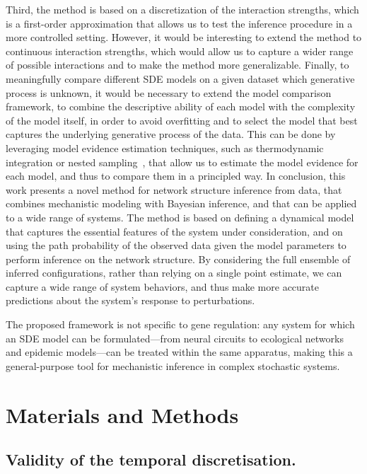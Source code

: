 \documentclass[10pt, aps, rmp,  twocolumn, superscriptaddress, floatfix, showkeys]{revtex4-2}
\begin{document}
Third, the method is based on a discretization of the interaction strengths, which is a first-order approximation that allows us to test the inference procedure in a more controlled setting. However, it would be interesting to extend the method to continuous interaction strengths, which would allow us to capture a wider range of possible interactions and to make the method more generalizable. 
Finally, to meaningfully compare different SDE models on a given dataset which generative process is unknown, it would be necessary to extend the model comparison framework, to combine the descriptive ability of each model with the complexity of the model itself, in order to avoid overfitting and to select the model that best captures the underlying generative process of the data. This can be done by leveraging model evidence estimation techniques, such as thermodynamic integration or nested sampling~\cite{skilling2006nested, buchner2023nested}, that allow us to estimate the model evidence for each model, and thus to compare them in a principled way.
In conclusion, this work presents a novel method for network structure inference from data, that combines mechanistic modeling with Bayesian inference, and that can be applied to a wide range of systems. The method is based on defining a dynamical model that captures the essential features of the system under consideration, and on using the path probability of the observed data given the model parameters to perform inference on the network structure. By considering the full ensemble of inferred configurations, rather than relying on a single point estimate, we can capture a wide range of system behaviors, and thus make more accurate predictions about the system's response to perturbations.

The proposed framework is not specific to gene regulation: any system for which an SDE model can be formulated—from neural circuits to ecological networks and epidemic models—can be treated within the same apparatus, making this a general-purpose tool for mechanistic inference in complex stochastic systems.



\section{Materials and Methods}

\subsection{Validity of the temporal discretisation.}
\end{document}

